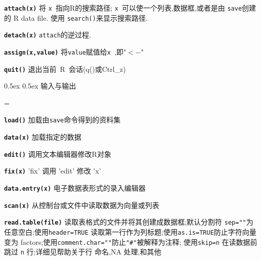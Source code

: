 \documentclass[landscape]{article}
\makeatletter
\renewcommand\section{\@startsection{section}{1}{0mm}%
                                     {0.5ex}%
                                     {0.5ex}%
                                {\color{black}\normalfont\large\bfseries}}
\newcommand{\code}{\texttt}
\newcommand{\bcode}[1]{\texttt{\textbf{#1}}}
\makeatother
\begin{document}
\begin{multicols*}{3}
\bcode{attach(x)} 将 \code{x}~指向R的搜索路径;
\code{x}~可以使一个列表,数据框,或者是由 \code{save}创建的 R data file.
使用 \code{search()}来显示搜索路径.

\bcode{detach(x)} \code{attach}的逆过程.

\bcode{assign(x,value)} 将\code{value}赋值给\code{x}~,即"$<-$"

\bcode{quit()}  退出当前~R~会话(q()或Ctrl\_z)


\section{输入与输出}

\everypar={\hangindent=9mm}

\bcode{load()} 加载由\code{save}命令得到的资料集

\bcode{data(x)} 加载指定的数据

\bcode{edit()}    调用文本编辑器修改R对象

\bcode{fix(x)}  'fix' 调用 'edit' 修改 'x'

\bcode{data.entry(x)}  电子数据表形式的录入编辑器

\bcode{scan(x)} 从控制台或文件中读取数据为向量或列表


\bcode{read.table(file)} 读取表格式的文件并将其创建成数据框;默认分割符
                \code{sep=""}为任意空白;使用\code{header=TRUE}
                读取第一行作为列标题;使用\code{as.is=TRUE}防止字符向量变为
                factors;使用\code{comment.char=""}防止\code{"\#"}被解释为注释;
                使用\code{skip=n} 在读数据前跳过 \code{n} 行;详细见帮助关于行
                命名,NA 处理,和其他


\end{multicols*}
\end{document}

